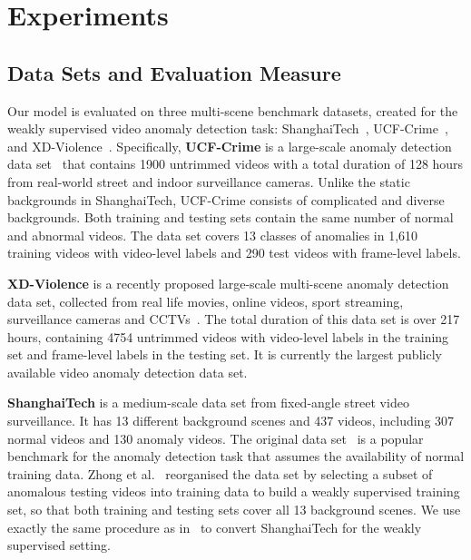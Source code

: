 \documentclass[final]{cvpr}
\begin{document}
\section{Experiments}


\subsection{Data Sets and Evaluation Measure}

Our model is evaluated on three  multi-scene benchmark datasets, created for the weakly supervised video anomaly detection task: ShanghaiTech~\cite{liu2018future}, UCF-Crime~\cite{sultani2018real}, and  XD-Violence~\cite{Wu2020not}. Specifically, \textbf{UCF-Crime} is a large-scale anomaly detection data set~\cite{sultani2018real} that contains 1900 untrimmed videos with a total duration of 128 hours from real-world street and indoor surveillance cameras. Unlike the static backgrounds in ShanghaiTech, UCF-Crime consists of complicated and diverse backgrounds.
Both training and testing sets contain the same number of normal and abnormal videos. The data set covers 13 classes of anomalies in 1,610 training videos with video-level labels and 290 test videos with frame-level labels. 

\textbf{XD-Violence} is a recently proposed large-scale multi-scene anomaly detection data set, collected from real life movies, online videos, sport streaming, surveillance cameras and CCTVs~\cite{Wu2020not}. The total duration of this data set is over 217 hours, containing 4754 untrimmed videos with video-level labels in the training set and frame-level labels in the testing set. It is currently the largest publicly available video anomaly detection data set.


\textbf{ShanghaiTech} is a medium-scale data set from fixed-angle street video surveillance. It has 13 different background scenes and 437 videos, including 307 normal videos and 130 anomaly videos. The original data set~\cite{liu2018future} is a popular benchmark for the anomaly detection task that assumes the availability of normal training data.
Zhong et al.~\cite{zhong2019graph} reorganised the data set by selecting a subset of anomalous testing videos into training data to build a weakly supervised training set,
so that both training and testing sets cover all 13 background scenes. We use exactly the same procedure as in~\cite{zhong2019graph} to convert ShanghaiTech for the weakly supervised setting.
\end{document}
